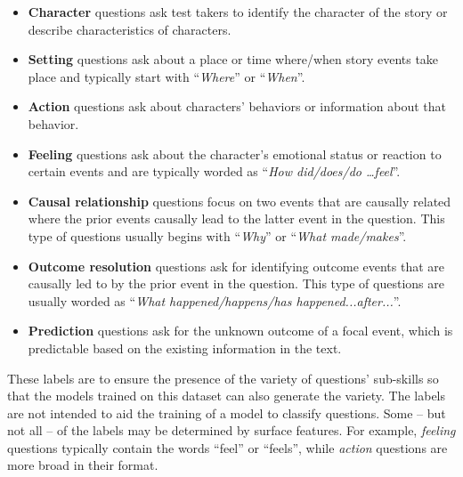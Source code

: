 \documentclass[11pt]{article}
\begin{document}
\begin{itemize}[nosep, leftmargin=1em,labelwidth=*,align=left]
\item \textbf{Character} questions ask test takers to identify the character of the story or describe characteristics of characters. 
  
  \item \textbf{Setting} questions ask about a place or time where/when story events take place and typically start with ``\emph{Where}'' or ``\emph{When}''.
  
  \item \textbf{Action} questions ask about characters' behaviors or information about that behavior.
  
  \item \textbf{Feeling} questions ask about the character's emotional status or reaction to certain events and are typically worded as ``\emph{How did/does/do …feel}''. 
  
  \item \textbf{Causal relationship} questions focus on two events that are causally related where the prior events causally lead to the latter event in the question. This type of questions usually begins with ``\emph{Why}'' or ``\emph{What made/makes}''. 
  
  \item \textbf{Outcome resolution} questions ask for identifying outcome events that are causally led to by the prior event in the question. This type of questions are usually worded as ``\emph{What happened/happens/has happened...after...}''. 
  \item \textbf{Prediction} questions ask for the unknown outcome of a focal event, which is predictable based on the existing information in the text. 
\end{itemize}

These labels are to ensure the presence of the variety of questions' sub-skills so that the models trained on this dataset can also generate the variety. The labels are not intended to aid the training of a model to classify questions. Some -- but not all -- of the labels may be determined by surface features. For example, \textit{feeling} questions typically contain the words ``feel'' or ``feels'', while  \textit{action} questions are more broad in their format.
\end{document}
